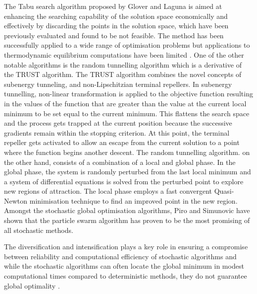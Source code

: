 	The Tabu search algorithm proposed by Glover and Laguna \cite{Glover:1993aa} is aimed at enhancing the searching capability of the solution space economically and effectively by discarding the points in the solution space, which have been previously evaluated and found to be not feasible. The method has been successfully applied to a wide range of optimisation problems but  applications to thermodynamic equilibrium computations have been limited \cite{SRINIVAS2007760,Teh03}. One of the other notable algorithms is the random tunnelling algorithm which is a derivative of the TRUST algorithm. The TRUST algorithm \cite{Barhen97} combines the novel concepts of subenergy tunneling, and non-Lipschitzian terminal repellers. In subenergy tunnelling, non-linear transformation is applied to the objective function resulting in the values of the function that are greater than the value at the current local minimum to be set equal to the current minimum. This flattens the search space and the process gets trapped at the current position because the successive gradients remain within the stopping criterion. At this point, the terminal repeller gets activated to allow an escape from the current solution to a point where the function begins another descent. The random tunnelling algorithm. on the other hand, consists of a combination of a local and global phase. In the global phase, the system is randomly perturbed from the last local minimum and a system of differential equations is solved from the perturbed point to explore new regions of attraction. The local phase employs a fast convergent Quasi-Newton minimisation technique to find an improved point in the new region. Amongst the stochastic global optimisation algorithms, Piro and Simunovic \cite{Piro16} have shown that the particle swarm algorithm has proven to be the most promising of all stochastic methods.

	The diversification and intensification plays a key role in ensuring a compromise between reliability and computational efficiency of stochastic algorithms and while the stochastic algorithms can often locate the global minimum in modest computational times compared to deterministic methods, they do not guarantee global optimality \cite{Zhang11,Blum:2003aa}.

